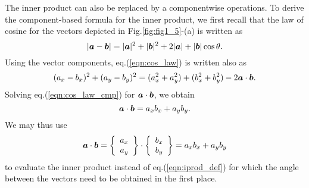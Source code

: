\documentclass[10pt,a4j]{article}
\begin{document}
The inner product can also be replaced by a componentwise operations.
To derive the component-based formula for the inner product, we first recall that 
the law of cosine for the vectors depicted in Fig.\ref{fig:fig1_5}-(a) is written as 
\begin{equation}
	\left| \mbox{\boldmath $a$}-\mbox{\boldmath $b$}\right|= 
	|\mbox{\boldmath $a$}|^2+|\mbox{\boldmath $b$}|^2
	+
	2|\mbox{\boldmath $a$}|+|\mbox{\boldmath $b$}| \cos\theta
	.
	\label{eqn:cos_law}
\end{equation}
Using the vector components, eq.(\ref{eqn:cos_law}) is written also as 
\begin{equation}
	(a_x-b_x)^2+(a_y-b_y)^2
	=
	(a_x^2+a_y^2)+(b_x^2+b_y^2) -2\mbox{\boldmath $a$}\cdot\mbox{\boldmath $b$}.
	\label{eqn:cos_law_cmp}
\end{equation}
Solving eq.(\ref{eqn:cos_law_cmp}) for $\mbox{\boldmath $a$}\cdot\mbox{\boldmath $b$}$, we obtain
\begin{equation}
	\mbox{\boldmath $a$}\cdot\mbox{\boldmath $b$}=a_xb_x+a_yb_y.
	\label{eqn:}
\end{equation}
We may thus use 
\begin{equation}
	\mbox{\boldmath $a$} \cdot \mbox{\boldmath $b$}
	=
	\left\{
		\begin{array}{c}
			a_x \\
			a_y 
		\end{array}
	\right\}
	\cdot
	\left\{
		\begin{array}{c}
			b_x \\
			b_y 
		\end{array}
	\right\}
	= a_xb_x+a_yb_y
	\label{eqn:}
\end{equation}
to evaluate the inner product instead of eq.(\ref{eqn:iprod_def}) for which the angle 
between the vectors need to be obtained in the first place. 
\end{document}
